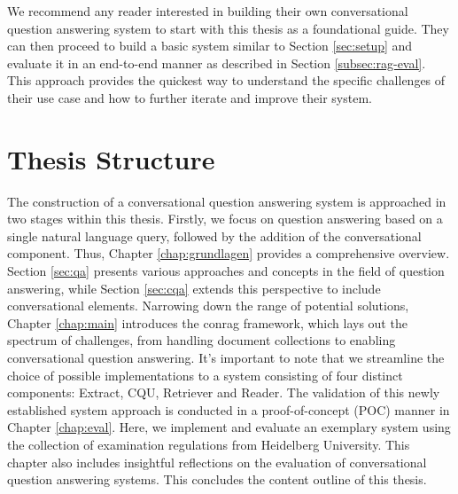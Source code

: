 We recommend any reader interested in building their own conversational question answering system to start with this thesis as a foundational guide. They can then proceed to build a basic system similar to Section \ref{sec:setup} and evaluate it in an end-to-end manner as described in Section \ref{subsec:rag-eval}. This approach provides the quickest way to understand the specific challenges of their use case and how to further iterate and improve their system.

\section{Thesis Structure}

The construction of a conversational question answering system is approached in two stages within this thesis. Firstly, we focus on question answering based on a single natural language query, followed by the addition of the conversational component. Thus, Chapter \ref{chap:grundlagen} provides a comprehensive overview. Section \ref{sec:qa} presents various approaches and concepts in the field of question answering, while Section \ref{sec:cqa} extends this perspective to include conversational elements. Narrowing down the range of potential solutions, Chapter \ref{chap:main} introduces the \gls{conrag} framework, which lays out the spectrum of challenges, from handling document collections to enabling conversational question answering. It's important to note that we streamline the choice of possible implementations to a system consisting of four distinct components: Extract, CQU, Retriever and Reader. The validation of this newly established system approach is conducted in a proof-of-concept (POC) manner in Chapter \ref{chap:eval}. Here, we implement and evaluate an exemplary system using the collection of examination regulations from Heidelberg University. This chapter also includes insightful reflections on the evaluation of conversational question answering systems. This concludes the content outline of this thesis.
